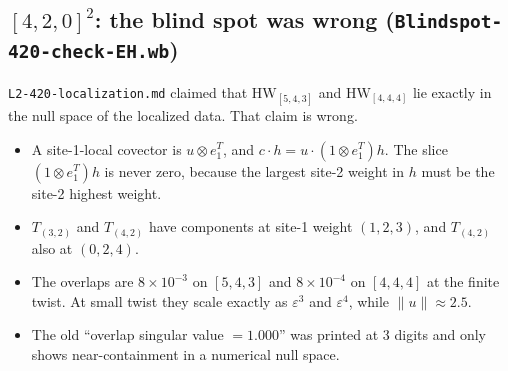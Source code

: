 \documentclass[11pt]{article}
\newcommand{\HW}{\mathrm{HW}}
\newcommand{\eps}{\varepsilon}
\begin{document}
\subsection{$[4,2,0]^2$: the blind spot was wrong (\texttt{Blindspot-420-check-EH.wb})}
\texttt{L2-420-localization.md} claimed that $\HW_{[5,4,3]}$ and $\HW_{[4,4,4]}$ lie exactly in the null space of the localized data. That claim is wrong.
\begin{itemize}
\item A site-1-local covector is $u\otimes e_1^T$, and $c\cdot h=u\cdot(1\otimes e_1^T)h$. The slice $(1\otimes e_1^T)h$ is never zero, because the largest site-2 weight in $h$ must be the site-2 highest weight.
\item $T_{(3,2)}$ and $T_{(4,2)}$ have components at site-1 weight $(1,2,3)$, and $T_{(4,2)}$ also at $(0,2,4)$.
\item The overlaps are $8\times10^{-3}$ on $[5,4,3]$ and $8\times10^{-4}$ on $[4,4,4]$ at the finite twist. At small twist they scale exactly as $\eps^3$ and $\eps^4$, while $\|u\|\approx2.5$.
\item The old ``overlap singular value $=1.000$'' was printed at 3 digits and only shows near-containment in a numerical null space.
\end{itemize}
\end{document}

